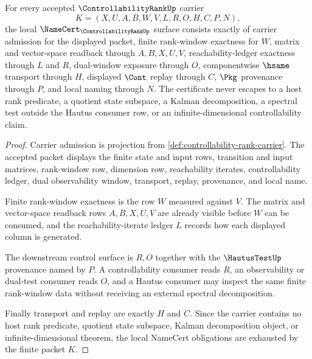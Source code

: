 \begin{theorem}
\label{thm:controllability-rank-namecert-obligations}
For every accepted $\ControllabilityRankUp$ carrier
$$
K=(X,U,A,B,W,V,L,R,O,H,C,P,N),
$$
the local $\NameCert_{\ControllabilityRankUp}$ surface consists exactly of carrier admission for the displayed packet, finite rank-window exactness for $W$, matrix and vector-space readback through $A,B,X,U,V$, reachability-ledger exactness through $L$ and $R$, dual-window exposure through $O$, componentwise $\hsame$ transport through $H$, displayed $\Cont$ replay through $C$, $\Pkg$ provenance through $P$, and local naming through $N$. The certificate never escapes to a host rank predicate, a quotient state subspace, a Kalman decomposition, a spectral test outside the Hautus consumer row, or an infinite-dimensional controllability claim.
\end{theorem}
\begin{proof}
Carrier admission is projection from \autoref{def:controllability-rank-carrier}. The accepted packet displays the finite state and input rows, transition and input matrices, rank-window row, dimension row, reachability iterates, controllability ledger, dual observability window, transport, replay, provenance, and local name.

Finite rank-window exactness is the row $W$ measured against $V$. The matrix and vector-space readback rows $A,B,X,U,V$ are already visible before $W$ can be consumed, and the reachability-iterate ledger $L$ records how each displayed column is generated.

The downstream control surface is $R,O$ together with the $\HautusTestUp$ provenance named by $P$. A controllability consumer reads $R$, an observability or dual-test consumer reads $O$, and a Hautus consumer may inspect the same finite rank-window data without receiving an external spectral decomposition.

Finally transport and replay are exactly $H$ and $C$. Since the carrier contains no host rank predicate, quotient state subspace, Kalman decomposition object, or infinite-dimensional theorem, the local NameCert obligations are exhausted by the finite packet $K$.
\end{proof}


